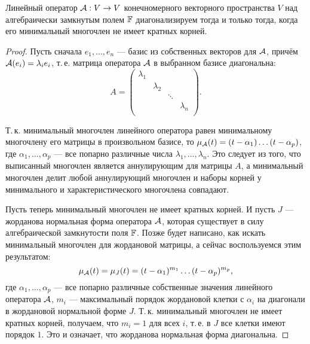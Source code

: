 \begin{theorem}
    Линейный оператор $\mathcal{A}: V \to V$ конечномерного векторного пространства $V$ над алгебраически замкнутым полем $\mathbb{F}$ диагонализируем тогда и только тогда, когда его минимальный многочлен не имеет кратных корней.
\end{theorem}

\begin{proof}
    Пусть сначала $e_1, \ldots, e_n$ --- базис из собственных векторов для $\mathcal{A}$, причём $\mathcal{A}(e_i) = \lambda_ie_i$, т.\,е. матрица оператора $\mathcal{A}$ в выбранном базисе диагональна:
    \[
        A =
        \begin{pmatrix}
            \lambda_1 &  &  & \\
             & \lambda_2 &  &  \\
             &  & \ddots &  \\
             &  &  & \lambda_n \\
        \end{pmatrix}.
    \]

    Т.\,к. минимальный многочлен линейного оператора равен минимальному многочлену его матрицы в произвольном базисе, то $\mu_{\mathcal{A}}(t) = (t - \alpha_1)\ldots(t - \alpha_p)$, где $\alpha_1, \ldots, \alpha_p$ --- все попарно различные числа $\lambda_1, \ldots, \lambda_n$. Это следует из того, что выписанный многочлен является аннулирующим для матрицы $A$, а минимальный многочлен делит любой аннулирующий многочлен и наборы корней у минимального и характеристического многочлена совпадают.

    Пусть теперь минимальный многочлен не имеет кратных корней. И пусть $J$ --- жорданова нормальная форма оператора $\mathcal{A}$, которая существует в силу алгебраической замкнутости поля $\mathbb{F}$. Позже будет написано, как искать минимальный многочлен для жордановой матрицы, а сейчас воспользуемся этим результатом:
    \[
        \mu_{\mathcal{A}}(t) = \mu_J(t) = (t - \alpha_1)^{m_1}\ldots(t - \alpha_p)^{m_p},
    \]
    где $\alpha_1, \ldots, \alpha_p$ --- все попарно различные собственные значения линейного оператора $\mathcal{A}$, $m_i$ --- максимальный порядок жордановой клетки с $\alpha_i$ на диагонали в жордановой нормальной форме $J$. Т.\,к. минимальный многочлен не имеет кратных корней, получаем, что $m_i = 1$ для всех $i$, т.\,е. в $J$ все клетки имеют порядок $1$. Это и означает, что жорданова нормальная форма диагональна.
\end{proof}

